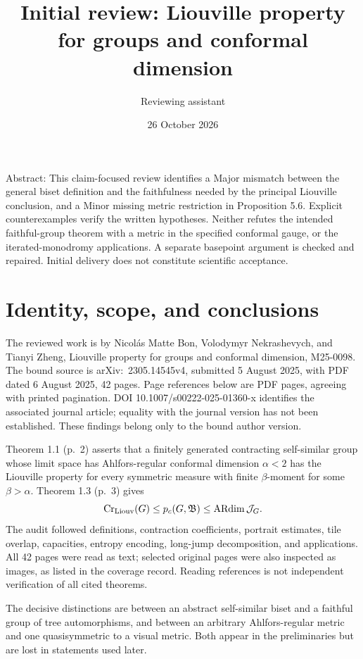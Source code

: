 \documentclass[10pt]{article}
\title{Initial review: Liouville property for groups and conformal dimension}
\author{Reviewing assistant}
\date{26 October 2026}
\begin{document}
\maketitle
Abstract: This claim-focused review identifies a Major mismatch between the general biset definition and the faithfulness needed by the principal Liouville conclusion, and a Minor missing metric restriction in Proposition 5.6. Explicit counterexamples verify the written hypotheses. Neither refutes the intended faithful-group theorem with a metric in the specified conformal gauge, or the iterated-monodromy applications. A separate basepoint argument is checked and repaired. Initial delivery does not constitute scientific acceptance.\par
\section*{Identity, scope, and conclusions}
The reviewed work is by Nicolás Matte Bon, Volodymyr Nekrashevych, and Tianyi Zheng, Liouville property for groups and conformal dimension, M25-0098. The bound source is arXiv: 2305.14545v4, submitted 5 August 2025, with PDF dated 6 August 2025, 42 pages. Page references below are PDF pages, agreeing with printed pagination. DOI 10.1007/s00222-025-01360-x identifies the associated journal article; equality with the journal version has not been established. These findings belong only to the bound author version.\par
Theorem 1.1 (p. 2) asserts that a finitely generated contracting self-similar group whose limit space has Ahlfors-regular conformal dimension \(\alpha<2\) has the Liouville property for every symmetric measure with finite \(\beta\)-moment for some \(\beta>\alpha\). Theorem 1.3 (p. 3) gives \[\operatorname{Cr}_{\rm Liouv}(G)\le p_c(G,\mathfrak B)\le\operatorname{ARdim}\mathcal J_G.\] The audit followed definitions, contraction coefficients, portrait estimates, tile overlap, capacities, entropy encoding, long-jump decomposition, and applications. All 42 pages were read as text; selected original pages were also inspected as images, as listed in the coverage record. Reading references is not independent verification of all cited theorems.\par
The decisive distinctions are between an abstract self-similar biset and a faithful group of tree automorphisms, and between an arbitrary Ahlfors-regular metric and one quasisymmetric to a visual metric. Both appear in the preliminaries but are lost in statements used later.\par
\end{document}
